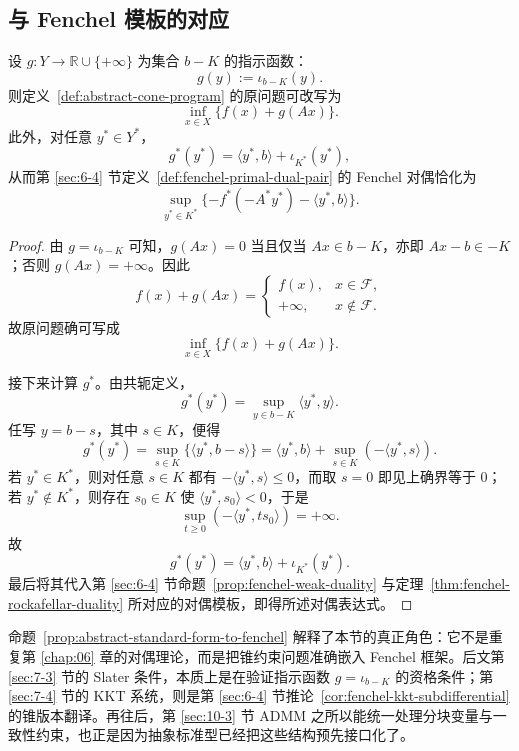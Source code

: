 \subsection{与 Fenchel 模板的对应}

\begin{proposition}\label{prop:abstract-standard-form-to-fenchel}
设 $g\colon Y\to \mathbb R\cup\{+\infty\}$ 为集合 $b-K$ 的指示函数：
\[
g(y):=\iota_{b-K}(y).
\]
则定义~\ref{def:abstract-cone-program} 的原问题可改写为
\[
\inf_{x\in X}\{f(x)+g(Ax)\}.
\]
此外，对任意 $y^\ast\in Y^\ast$，
\[
g^\ast(y^\ast)=\langle y^\ast,b\rangle+\iota_{K^\ast}(y^\ast),
\]
从而第 \ref{sec:6-4} 节定义~\ref{def:fenchel-primal-dual-pair} 的 Fenchel 对偶恰化为
\[
\sup_{y^\ast\in K^\ast}\{-f^\ast(-A^\ast y^\ast)-\langle y^\ast,b\rangle\}.
\]
\end{proposition}

\begin{proof}
由 $g=\iota_{b-K}$ 可知，$g(Ax)=0$ 当且仅当 $Ax\in b-K$，亦即 $Ax-b\in -K$；否则 $g(Ax)=+\infty$。因此
\[
f(x)+g(Ax)
=
\begin{cases}
f(x), & x\in \mathcal F,\\
+\infty, & x\notin \mathcal F.
\end{cases}
\]
故原问题确可写成
\[
\inf_{x\in X}\{f(x)+g(Ax)\}.
\]

接下来计算 $g^\ast$。由共轭定义，
\[
g^\ast(y^\ast)=\sup_{y\in b-K}\langle y^\ast,y\rangle.
\]
任写 $y=b-s$，其中 $s\in K$，便得
\[
g^\ast(y^\ast)=\sup_{s\in K}\{\langle y^\ast,b-s\rangle\}
=
\langle y^\ast,b\rangle+\sup_{s\in K}(-\langle y^\ast,s\rangle).
\]
若 $y^\ast\in K^\ast$，则对任意 $s\in K$ 都有 $-\langle y^\ast,s\rangle\le 0$，而取 $s=0$ 即见上确界等于 $0$；若 $y^\ast\notin K^\ast$，则存在 $s_0\in K$ 使 $\langle y^\ast,s_0\rangle<0$，于是
\[
\sup_{t\ge 0}(-\langle y^\ast,ts_0\rangle)=+\infty.
\]
故
\[
g^\ast(y^\ast)=\langle y^\ast,b\rangle+\iota_{K^\ast}(y^\ast).
\]
最后将其代入第 \ref{sec:6-4} 节命题~\ref{prop:fenchel-weak-duality} 与定理~\ref{thm:fenchel-rockafellar-duality} 所对应的对偶模板，即得所述对偶表达式。
\end{proof}

\begin{remark}\label{remark:standard-form-interface}
命题~\ref{prop:abstract-standard-form-to-fenchel} 解释了本节的真正角色：它不是重复第 \ref{chap:06} 章的对偶理论，而是把锥约束问题准确嵌入 Fenchel 框架。后文第 \ref{sec:7-3} 节的 Slater 条件，本质上是在验证指示函数 $g=\iota_{b-K}$ 的资格条件；第 \ref{sec:7-4} 节的 KKT 系统，则是第 \ref{sec:6-4} 节推论~\ref{cor:fenchel-kkt-subdifferential} 的锥版本翻译。再往后，第 \ref{sec:10-3} 节 ADMM 之所以能统一处理分块变量与一致性约束，也正是因为抽象标准型已经把这些结构预先接口化了。
\end{remark}


